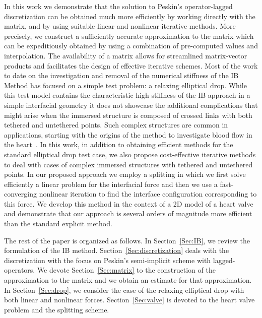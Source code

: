 \documentclass[preprint,12pt]{elsarticle}
\begin{document}
In this work  we demonstrate that the solution to Peskin's operator-lagged discretization
can be obtained much more efficiently by working directly with the matrix, and by using suitable linear and nonlinear iterative methods. More precisely, we construct a sufficiently accurate approximation to the matrix which can
be expeditiously obtained by using a combination of pre-computed values and interpolation.   The availability  of a matrix allows 
for streamlined matrix-vector products and facilitates the design of effective iterative schemes.   Most of the work to date on the investigation and removal of the numerical stiffness of the IB Method has focused on a simple test problem: a relaxing elliptical drop.
While this test model contains the characteristic high stiffness of the IB approach in a simple interfacial geometry it does not showcase the additional complications that might arise when the immersed structure is composed of crossed links with both tethered and untethered points. Such complex structures are common in applications, starting with the origins of the method to investigate blood
flow in the heart~\cite{Peskin77}.  In this work, in addition to obtaining efficient methods for 
the standard elliptical drop test case, we also propose cost-effective iterative methods to deal with cases of complex immersed structures with tethered and untethered points. In our proposed approach
we employ  a splitting in which we first solve efficiently a linear problem for the interfacial force and then we use a fast-converging nonlinear iteration to find the interface configuration corresponding to this force.  We develop this method in the context of a 2D
model of a heart valve and demonstrate that our approach is several orders of magnitude more efficient than the standard explicit method. 
 
 The rest of the paper is organized as follows. In Section~\ref{Sec:IB}, we review the formulation of the IB method. Section~\ref{Sec:discretization} deals with the discretization with the focus on  Peskin's semi-implicit scheme with lagged-operators. We devote Section~\ref{Sec:matrix} to the construction of the approximation to the matrix and we obtain an estimate for that approximation.
 In Section~\ref{Sec:drop}, we consider the case of the relaxing elliptical drop with both linear and nonlinear forces.  Section~\ref{Sec:valve} is devoted to the heart valve problem and the splitting scheme.
\end{document}
